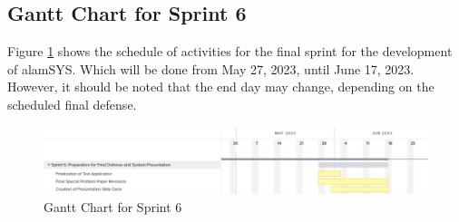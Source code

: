 \subsection{Gantt Chart for Sprint 6}
\label{subsec:gantt_chart_sprint6}
Figure \ref{fig:gantt_chart_sprint6} shows the schedule of activities for the final sprint 
for the development of alamSYS. Which will be done from May 27, 2023, 
until June 17, 2023. However, it should be noted that the end day may change, 
depending on the scheduled final defense.
\begin{figure}[ht]
    \centering
    \includegraphics[width=1\textwidth]{./assets/Chapter_3/Gantt/Gantt_Chart_Sprint6.png}
    \caption{Gantt Chart for Sprint 6}
    \label{fig:gantt_chart_sprint6}
\end{figure}
\FloatBarrier